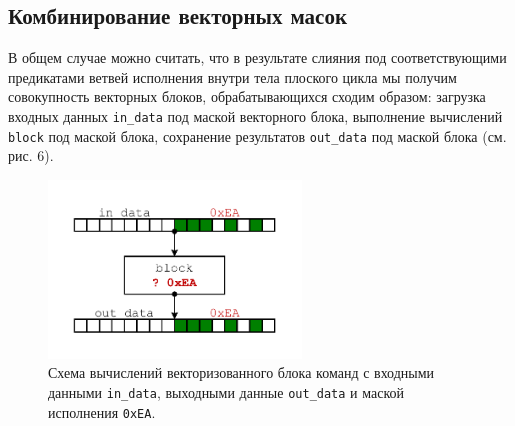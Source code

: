 \subsection{Комбинирование векторных масок}

В общем случае можно считать, что в результате слияния под соответствующими предикатами ветвей исполнения внутри тела плоского цикла мы получим совокупность векторных блоков, обрабатывающихся сходим образом: загрузка входных данных \texttt{in\_data} под маской векторного блока, выполнение вычислений \texttt{block} под маской блока, сохранение результатов \texttt{out\_data} под маской блока (см. рис. 6).

\begin{figure}[ht]
	\centering
		\includegraphics[width=0.6\textwidth]{./pics/text_4_vec_comb_mask/vec_block.pdf}
	\caption{Схема вычислений векторизованного блока команд с входными данными \texttt{in\_data}, выходными данные \texttt{out\_data} и маской исполнения \texttt{0xEA}.}
	\label{fig:text_4_vec_comb_mask_vec_block}
\end{figure}

